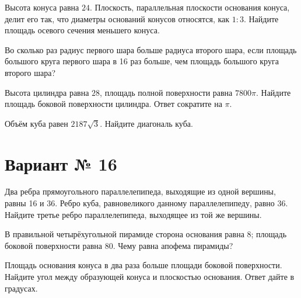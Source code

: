 \documentclass[4apaper]{article}
\begin{document}
\begin{taskBN}{3}
Высота конуса равна $24$. Плоскость, параллельная плоскости основания конуса,  делит его так, что диаметры оснований конусов относятся, как $1:3$. Найдите площадь осевого сечения меньшего конуса. 
\end{taskBN}

\begin{taskBN}{4}
Во сколько раз радиус первого шара больше радиуса второго шара, если площадь большого круга первого шара в 16 раз больше, чем площадь большого круга второго шара?
\end{taskBN}

\begin{taskBN}{5}
Высота цилиндра равна $28$, площадь полной поверхности равна $7800\pi$. Найдите площадь боковой поверхности цилиндра. Ответ сократите на $\pi$.
\end{taskBN}

\begin{taskBN}{6}
Объём куба равен $2187\sqrt{3}$. Найдите диагональ куба.
\end{taskBN}
\newpage\section*{Вариант № 16}

\begin{taskBN}{1}
Два ребра прямоугольного параллелепипеда, выходящие из одной вершины, равны 16 и 36. Ребро куба, равновеликого данному параллелепипеду, равно 36. Найдите третье ребро параллелепипеда, выходящее из той же вершины.
\end{taskBN}

\begin{taskBN}{2}
В правильной четырёхугольной пирамиде сторона основания равна 8; площадь боковой поверхности равна 80. Чему равна апофема пирамиды?
\end{taskBN}

\begin{taskBN}{3}
Площадь основания конуса в два раза больше площади боковой поверхности. Найдите угол между образующей конуса и плоскостью основания. Ответ дайте в градусах.
\end{taskBN}
\end{document}
